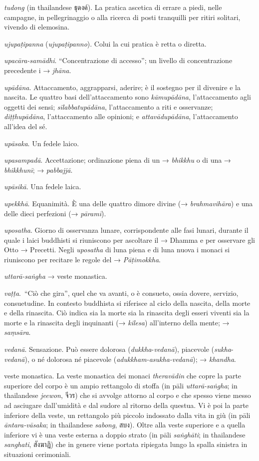 \emph{tudong} (in thailandese ธุดงค์). La pratica ascetica di errare a
piedi, nelle campagne, in pellegrinaggio o alla ricerca di posti
tranquilli per ritiri solitari, vivendo di elemosina.

\emph{ujupaṭipanna} (\emph{ujupaṭipanno}). Colui la cui pratica è retta
o diretta.

\emph{upacāra-samādhi}. ``Concentrazione di accesso''; un livello di
concentrazione precedente i → \emph{jhāna}.

\emph{upādāna}. Attaccamento, aggrapparsi, aderire; è il sostegno per il
divenire e la nascita. Le quattro basi dell'attaccamento sono
\emph{kāmupādāna}, l'attaccamento agli oggetti dei sensi;
\emph{sīlabbatupādāna}, l'attaccamento a riti e osservanze;
\emph{diṭṭhupādāna}, l'attaccamento alle opinioni; e
\emph{attavādupādāna}, l'attaccamento all'idea del sé.

\emph{upāsaka}. Un fedele laico.

\emph{upasampadā}. Accettazione; ordinazione piena di un →
\emph{bhikkhu} o di una → \emph{bhikkhunī}; → \emph{pabbajjā}.

\emph{upāsikā}. Una fedele laica.

\emph{upekkhā}. Equanimità. È una delle quattro dimore divine (→
\emph{brahmavihāra}) e una delle dieci perfezioni (→ \emph{pāramī}).

\emph{uposatha}. Giorno di osservanza lunare, corrispondente alle fasi
lunari, durante il quale i laici buddhisti si riuniscono per ascoltare
il → Dhamma e per osservare gli Otto → Precetti. Negli \emph{uposatha}
di luna piena e di luna nuova i monaci si riuniscono per recitare le
regole del → \emph{Pāṭimokkha}.

\emph{uttarā-saṅgha} → veste monastica.

\emph{vaṭṭa}.~``Ciò che gira'', quel che va avanti, o è consueto, ossia
dovere, servizio, consuetudine. In contesto buddhista si riferisce al
ciclo della nascita, della morte e della rinascita. Ciò indica sia la
morte sia la rinascita degli esseri viventi sia la morte e la rinascita
degli inquinanti (→ \emph{kilesa}) all'interno della mente; →
\emph{saṃsāra}.

\emph{vedanā}. Sensazione. Può essere dolorosa
(\emph{dukkha}-\emph{vedanā}), piacevole (\emph{sukha}-\emph{vedanā}), o
né dolorosa né piacevole (\emph{adukkham-asukha-vedanā}); →
\emph{khandha}.

veste monastica. La veste monastica dei monaci \emph{theravādin} che
copre la parte superiore del corpo è un ampio rettangolo di stoffa (in
pāli \emph{uttarā-saṅgha}; in thailandese \emph{jeewon}, จีวร) che si
avvolge attorno al corpo e che spesso viene messo ad asciugare
dall'umidità e dal sudore al ritorno della questua. Vi è poi la parte
inferiore della veste, un rettangolo più piccolo indossato dalla vita in
giù (in pāli \emph{āntara-vāsaka}; in thailandese \emph{sabong}, สบง).
Oltre alla veste superiore e a quella inferiore vi è una veste esterna a
doppio strato (in pāli \emph{saṅghāti}; in thailandese \emph{sanghati},
สังฆาฏิ) che in genere viene portata ripiegata lungo la spalla sinistra
in situazioni cerimoniali.

